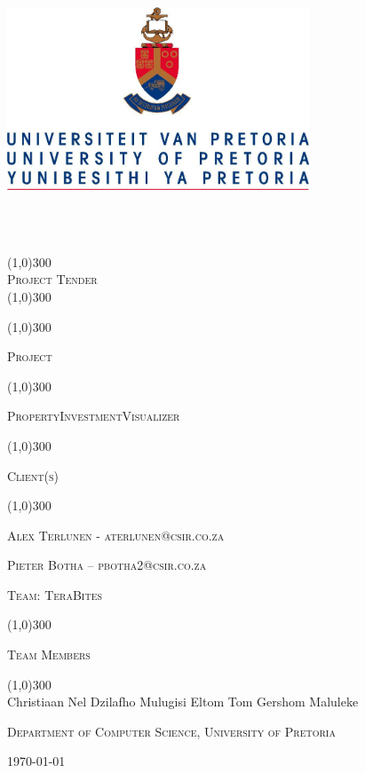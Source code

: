 \documentclass[12pt,a4paper]{report}
\begin{document}
\begin{titlepage}
	\begin{center}
		\vspace*{-3cm}\includegraphics[width=9cm,height=9cm,keepaspectratio]{UP.jpg}  \\
		[0.05cm]
		\line(1,0){300} \\
		[0.4cm]
		\textsc{\huge
			Project Tender
		} \\
		[0.1cm]
		\line(1,0){300} \\
		[0.05cm]

	\end{center}
	\centering
	\vspace{0.007cm}
	\line(1,0){300}
	\\[0.05cm]
    {\scshape\Large Project \par}
    \line(1,0){300}
	\\[0.2cm]
    {\scshape\large  PropertyInvestmentVisualizer \par}
	\vspace{0.1cm}
	\line(1,0){300}
	\\[0.05cm]
	{\scshape\Large Client(s) \par}
	\line(1,0){300}
	\\[0.2cm]
	\vspace{0.01cm}
	
	{\scshape\large Alex Terlunen - aterlunen@csir.co.za\par}
	{\scshape\large Pieter Botha – pbotha2@csir.co.za \par}
	\vspace{0.5cm}
	{\scshape\Large Team: \large TeraBites\par}
	\line(1,0){300}
	\\[0.01cm]
	{\scshape\Large Team Members\par}
	\line(1,0){300}
	\\[0.01cm]
	\vspace{0.9cm}
	\vfill Christiaan Nel
	\vfill Dzilafho Mulugisi
	\vfill Eltom Tom
	\vfill Gershom Maluleke
	
	\vspace{0.9cm}
    {\scshape\large Department of Computer Science, University of Pretoria\par}


	

	{\large \today\par}
	\end{titlepage}
	
\end{document}
